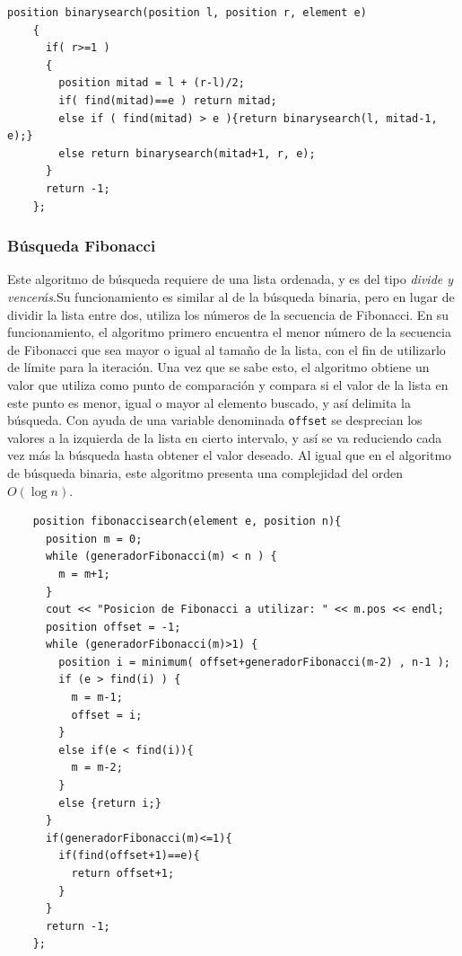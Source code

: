 \begin{verbatim}
position binarysearch(position l, position r, element e)
    {
      if( r>=1 )
      {
        position mitad = l + (r-l)/2;
        if( find(mitad)==e ) return mitad;
        else if ( find(mitad) > e ){return binarysearch(l, mitad-1, e);}
        else return binarysearch(mitad+1, r, e);
      }
      return -1;
    };
\end{verbatim}

\subsubsection{Búsqueda Fibonacci}
Este algoritmo de búsqueda requiere de una lista ordenada, y es del tipo \textit{divide y vencerás}.Su funcionamiento es similar al de la búsqueda binaria, pero en lugar de dividir la lista entre dos, utiliza los números de la secuencia de Fibonacci. En su funcionamiento, el algoritmo primero encuentra el menor número de la secuencia de Fibonacci que sea mayor o igual al tamaño de la lista, con el fin de utilizarlo de límite para la iteración. Una vez que se sabe esto, el algoritmo obtiene un valor que utiliza como punto de comparación y compara si el valor de la lista en este punto es menor, igual o mayor al elemento buscado, y así delimita la búsqueda. Con ayuda de una variable denominada \texttt{offset} se desprecian los valores a la izquierda de la lista en cierto intervalo, y así se va reduciendo cada vez más la búsqueda hasta obtener el valor deseado. Al igual que en el algoritmo de búsqueda binaria, este algoritmo presenta una complejidad del orden $O(\log n)$.

\begin{verbatim}
    position fibonaccisearch(element e, position n){
      position m = 0;
      while (generadorFibonacci(m) < n ) {
        m = m+1;
      }
      cout << "Posicion de Fibonacci a utilizar: " << m.pos << endl;
      position offset = -1;
      while (generadorFibonacci(m)>1) {
        position i = minimum( offset+generadorFibonacci(m-2) , n-1 );
        if (e > find(i) ) {
          m = m-1;
          offset = i;
        }
        else if(e < find(i)){
          m = m-2;
        }
        else {return i;}
      }
      if(generadorFibonacci(m)<=1){
        if(find(offset+1)==e){
          return offset+1;
        }
      }
      return -1;
    };
\end{verbatim}


